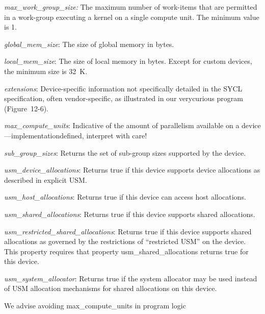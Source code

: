 \textit{max\_work\_group\_size:} The maximum number of work-items that are permitted in a work-group executing a kernel on a single compute unit. The minimum value is 1.\par

\textit{global\_mem\_size}: The size of global memory in bytes.\par

\textit{local\_mem\_size}: The size of local memory in bytes. Except for custom devices, the minimum size is 32 K.\par

\textit{extensions}: Device-specific information not specifically detailed in the SYCL specification, often vendor-specific, as illustrated in our verycurious program (Figure 12-6).\par

\textit{max\_compute\_units}: Indicative of the amount of parallelism available on a device—implementationdefined, interpret with care!\par

\textit{sub\_group\_sizes}: Returns the set of sub-group sizes supported by the device.\par

\textit{usm\_device\_allocations}: Returns true if this device supports device allocations as described in explicit USM.\par

\textit{usm\_host\_allocations}: Returns true if this device can access host allocations.\par

\textit{usm\_shared\_allocations}: Returns true if this device supports shared allocations.\par

\textit{usm\_restricted\_shared\_allocations}: Returns true if this device supports shared allocations as governed by the restrictions of “restricted USM” on the device. This property requires that property usm\_shared\_allocations returns true for this device.\par

\textit{usm\_system\_allocator}: Returns true if the system allocator may be used instead of USM allocation mechanisms for shared allocations on this device.\par

\begin{tcolorbox}[colback=red!5!white,colframe=red!75!black]
We advise avoiding max\_compute\_units in program logic
\end{tcolorbox}

